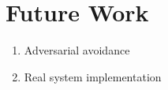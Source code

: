 \section{Future Work}
\begin{enumerate}
	\item Adversarial avoidance
	\item Real system implementation
\end{enumerate}








    


